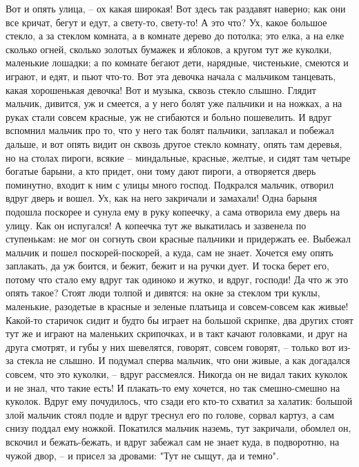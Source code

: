 \documentclass[a4paper, 10pt]{article}
\begin{document}
    Вот и опять улица, -- ох какая широкая! Вот здесь так раздавят наверно; как они все кричат, бегут и едут, а свету-то, свету-то! А это что? Ух, какое большое стекло, а за стеклом комната, а в комнате дерево до потолка; это елка, а на елке сколько огней, сколько золотых бумажек и яблоков, а кругом тут же куколки, маленькие лошадки; а по комнате бегают дети, нарядные, чистенькие, смеются и играют, и едят, и пьют что-то. Вот эта девочка начала с мальчиком танцевать, какая хорошенькая девочка! Вот и музыка, сквозь стекло слышно. Глядит мальчик, дивится, уж и смеется, а у него болят уже пальчики и на ножках, а на руках стали совсем красные, уж не сгибаются и больно пошевелить. И вдруг вспомнил мальчик про то, что у него так болят пальчики, заплакал и побежал дальше, и вот опять видит он сквозь другое стекло комнату, опять там деревья, но на столах пироги, всякие -- миндальные, красные, желтые, и сидят там четыре богатые барыни, а кто придет, они тому дают пироги, а отворяется дверь поминутно, входит к ним с улицы много господ. Подкрался мальчик, отворил вдруг дверь и вошел. Ух, как на него закричали и замахали! Одна барыня подошла поскорее и сунула ему в руку копеечку, а сама отворила ему дверь на улицу. Как он испугался! А копеечка тут же выкатилась и зазвенела по ступенькам: не мог он согнуть свои красные пальчики и придержать ее. Выбежал мальчик и пошел поскорей-поскорей, а куда, сам не знает. Хочется ему опять заплакать, да уж боится, и бежит, бежит и на ручки дует. И тоска берет его, потому что стало ему вдруг так одиноко и жутко, и вдруг, господи! Да что ж это опять такое? Стоят люди толпой и дивятся: на окне за стеклом три куклы, маленькие, разодетые в красные и зеленые платьица и совсем-совсем как живые! Какой-то старичок сидит и будто бы играет на большой скрипке, два других стоят тут же и играют на маленьких скрипочках, и в такт качают головками, и друг на друга смотрят, и губы у них шевелятся, говорят, совсем говорят, -- только вот из-за стекла не слышно. И подумал сперва мальчик, что они живые, а как догадался совсем, что это куколки, -- вдруг рассмеялся. Никогда он не видал таких куколок и не знал, что такие есть! И плакать-то ему хочется, но так смешно-смешно на куколок. Вдруг ему почудилось, что сзади его кто-то схватил за халатик: большой злой мальчик стоял подле и вдруг треснул его по голове, сорвал картуз, а сам снизу поддал ему ножкой. Покатился мальчик наземь, тут закричали, обомлел он, вскочил и бежать-бежать, и вдруг забежал сам не знает куда, в подворотню, на чужой двор, -- и присел за дровами: "Тут не сыщут, да и темно". 
    
\end{document}
